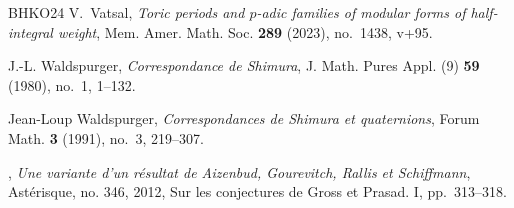 \documentclass[12pt]{amsart}
\theoremstyle{definition}
\theoremstyle{remark}
\begin{document}
\begin{thebibliography}{BHKO24}
V.~Vatsal, \emph{Toric periods and {$p$}-adic families of modular forms of
  half-integral weight}, Mem. Amer. Math. Soc. \textbf{289} (2023), no.~1438,
  v+95. 

J.-L. Waldspurger, \emph{Correspondance de {S}himura}, J. Math. Pures Appl. (9)
  \textbf{59} (1980), no.~1, 1--132. 

Jean-Loup Waldspurger, \emph{Correspondances de {S}himura et quaternions},
  Forum Math. \textbf{3} (1991), no.~3, 219--307. 

\bysame, \emph{Une variante d'un r\'{e}sultat de {A}izenbud, {G}ourevitch,
  {R}allis et {S}chiffmann}, Ast{\'e}risque, no. 346, 2012, Sur les conjectures de Gross et
  Prasad. I, pp.~313--318. 

\end{thebibliography}
\end{document}

